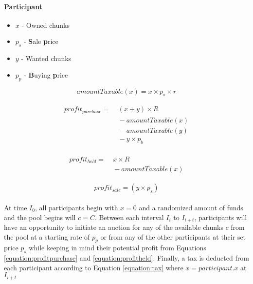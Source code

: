 \paragraph{Participant}

\begin{itemize}
  \item $x$ - Owned chunks
  \item $p_s$ - \textbf{S}ale \textbf{p}rice
  \item $y$ - Wanted chunks
  \item $p_p$ - \textbf{B}uying \textbf{p}rice
\end{itemize}

\begin{equation} \label{equation:tax}
  amountTaxable(x) = x \times p_s \times r
\end{equation}

\begin{align} \label{equation:profitpurchase}
  \begin{split}
    profit_{purchase} = &\; (x + y) \times R \\
    &\; - amountTaxable(x) \\
    &\; - amountTaxable(y) \\
    &\; - y \times p_b
  \end{split}
\end{align}

\begin{align} \label{equation:profitheld}
  \begin{split}
    profit_{held} = &\; x \times R \\
    &\; - amountTaxable(x)
  \end{split}
\end{align}

\begin{equation} \label{equation:profitsale}
  profit_{sale} = (y \times p_s)
\end{equation}

\paragraph{} At time $I_0$, all participants begin with $x = 0$ and a randomized amount of funds and the pool begins will $c = C$. Between each interval $I_i$ to $I_{i + t}$, participants will have an opportunity to initiate an auction for any of the available chunks $c$ from the pool at a starting rate of $p_p$ or from any of the other participants at their set price $p_s$ while keeping in mind their potential profit from Equations \ref{equation:profitpurchase} and \ref{equation:profitheld}. Finally, a tax is deducted from each participant according to Equation \ref{equation:tax} where $x = participant.x$ at $I_{i + t}$


